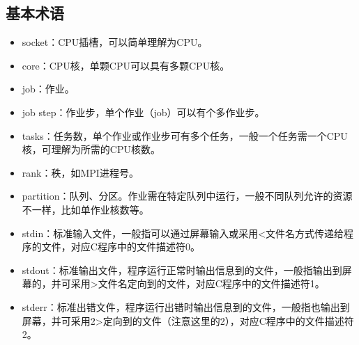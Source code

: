 \subsection{基本术语}
\begin{itemize}
	\item socket：CPU插槽，可以简单理解为CPU。
	\item core：CPU核，单颗CPU可以具有多颗CPU核。
	\item job：作业。
	\item job step：作业步，单个作业（job）可以有个多作业步。
	\item tasks：任务数，单个作业或作业步可有多个任务，一般一个任务需一个CPU核，可理解为所需的CPU核数。
	\item rank：秩，如MPI进程号。
	\item partition：队列、分区。作业需在特定队列中运行，一般不同队列允许的资源不一样，比如单作业核数等。
	\item stdin：标准输入文件，一般指可以通过屏幕输入或采用<文件名方式传递给程序的文件，对应C程序中的文件描述符0。
	\item stdout：标准输出文件，程序运行正常时输出信息到的文件，一般指输出到屏幕的，并可采用>文件名定向到的文件，对应C程序中的文件描述符1。
	\item stderr：标准出错文件，程序运行出错时输出信息到的文件，一般指也输出到屏幕，并可采用2>定向到的文件（注意这里的2），对应C程序中的文件描述符2。
\end{itemize}


